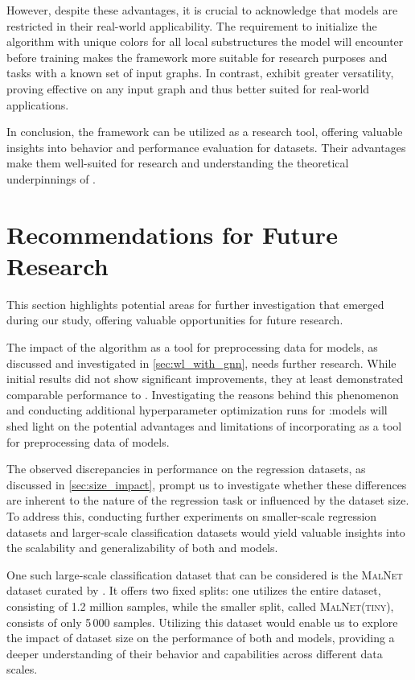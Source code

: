 However, despite these advantages, it is crucial to acknowledge that \wlnn models are restricted in their real-world applicability. The requirement to initialize the \wl algorithm with unique colors for all local substructures the model will encounter before training makes the \wlnn framework more suitable for research purposes and tasks with a known set of input graphs. In contrast, \gnns exhibit greater versatility, proving effective on any input graph and thus better suited for real-world applications.

In conclusion, the \wlnn framework can be utilized as a research tool, offering valuable insights into \gnn behavior and performance evaluation for datasets. Their advantages make them well-suited for research and understanding the theoretical underpinnings of \gnns. 

\section{Recommendations for Future Research}
This section highlights potential areas for further investigation that emerged during our study, offering valuable opportunities for future research.

The impact of the \wl algorithm as a tool for preprocessing data for \gnn models, as discussed and investigated in \cref{sec:wl_with_gnn}, needs further research. While initial results did not show significant improvements, they at least demonstrated comparable performance to \gnns. Investigating the reasons behind this phenomenon and conducting additional hyperparameter optimization runs for \wl:\gnn models will shed light on the potential advantages and limitations of incorporating \wl as a tool for preprocessing data of \gnn models.

The observed discrepancies in performance on the regression datasets, as discussed in \cref{sec:size_impact}, prompt us to investigate whether these differences are inherent to the nature of the regression task or influenced by the dataset size. To address this, conducting further experiments on smaller-scale regression datasets and larger-scale classification datasets would yield valuable insights into the scalability and generalizability of both \wlnn and \gnn models.

One such large-scale classification dataset that can be considered is the \textsc{MalNet} dataset curated by \cite{Freitas2022}. It offers two fixed splits: one utilizes the entire dataset, consisting of 1.2 million samples, while the smaller split, called \textsc{MalNet(tiny)}, consists of only 5\,000 samples. Utilizing this dataset would enable us to explore the impact of dataset size on the performance of both \wlnn and \gnn models, providing a deeper understanding of their behavior and capabilities across different data scales.

